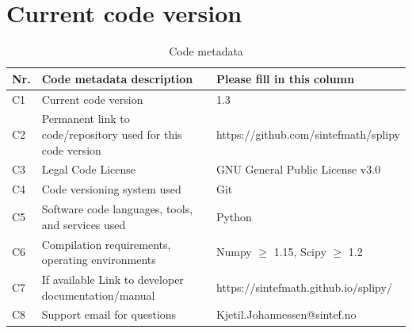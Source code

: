 \documentclass[preprint,12pt, a4paper]{elsarticle}
\begin{document}
{}








\section*{Current code version}
\label{}


\begin{table}[!h]
\begin{tabular}{|l|p{5.5cm}|p{7.5cm}|}
\hline
\textbf{Nr.} & \textbf{Code metadata description} & \textbf{Please fill in this column} \\
\hline
C1 & Current code version & 1.3 \\
\hline
C2 & Permanent link to code/repository used for this code version & https://github.com/sintefmath/splipy \\
\hline
C3 & Legal Code License   & GNU General Public License v3.0  \\
\hline
C4 & Code versioning system used & Git \\
\hline
C5 & Software code languages, tools, and services used & Python \\
\hline
C6 & Compilation requirements, operating environments & Numpy $\geq$ 1.15, Scipy $\geq$ 1.2 \\
\hline
C7 & If available Link to developer documentation/manual & https://sintefmath.github.io/splipy/ \\
\hline
C8 & Support email for questions & Kjetil.Johannessen@sintef.no \\
\hline
\end{tabular}
\caption{Code metadata}
\label{}
\end{table}

%
%
\end{document}
